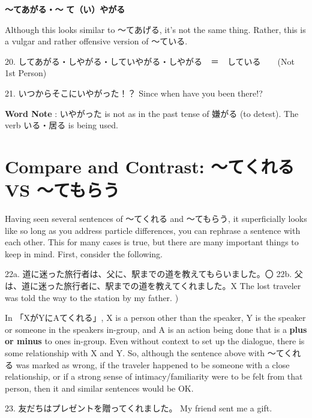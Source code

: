 \par{\textbf{～てあがる・～ }\textbf{て（い）やがる }}
 
\par{Although this looks similar to ～てあげる, it's not the same thing. Rather, this is a vulgar and rather offensive version of ～ている. }
 
\par{20. してあがる・しやがる・していやがる・しやがる　＝　している　　(Not 1st Person) }
 
\par{21. いつからそこにいやがった！？ \hfill\break
Since when have you been there!? }
 
\par{\textbf{Word Note }: いやがった is not as in the past tense of 嫌がる (to detest). The verb いる・居る is being used. }
      
\section{Compare and Contrast: ～てくれる VS ～てもらう}
 
\par{ Having seen several sentences of ～てくれる and ～てもらう, it superficially looks like so long as you address particle differences, you can rephrase a sentence with each other. This for many cases is true, but there are many important things to keep in mind. First, consider the following. }
 
\par{22a. 道に迷った旅行者は、父に、駅までの道を教えてもらいました。〇 \hfill\break
22b. 父は、道に迷った旅行者に、駅までの道を教えてくれました。X \hfill\break
The lost traveler was told the way to the station by my father. ) }
 
\par{ In 「XがYにAてくれる」, X is a person other than the speaker, Y is the speaker or someone in the speaker\textquotesingle s in-group, and A is an action being done that is a \textbf{plus or minus  }to one\textquotesingle s in-group. Even without context to set up the dialogue, there is some relationship with X and Y. So, although the sentence above with ～てくれる was marked as wrong, if the traveler happened to be someone with a close relationship, or if a strong sense of intimacy\slash familiarity were to be felt from that person, then it and similar sentences would be OK. }
 
\par{23. 友だちはプレゼントを贈ってくれました。 \hfill\break
My friend sent me a gift. }
 
